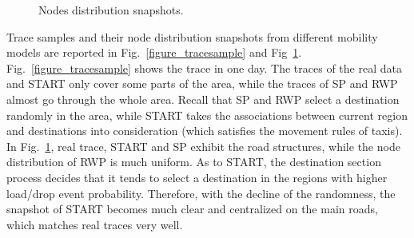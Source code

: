 \begin{figure}[!t]
\centering
{}
\caption{Nodes distribution snapshots.}\label{figure_trace_snapshots}
\end{figure}

Trace samples and their node distribution snapshots from different mobility models are reported in Fig.~\ref{figure_tracesample} and Fig~\ref{figure_trace_snapshots}. Fig.~\ref{figure_tracesample} shows the trace in one day. The traces of the real data and START only cover some parts of the area, while the traces of SP and RWP almost go through the whole area. Recall that SP and RWP select a destination randomly in the area, while START takes the associations between current region and destinations into consideration (which satisfies the movement rules of taxis). In Fig.~\ref{figure_trace_snapshots}, real trace, START and SP exhibit the road structures, while the node distribution of RWP is much uniform. As to START, the destination section process decides that it tends to select a destination in the regions with higher load/drop event probability. Therefore, with the decline of the randomness, the snapshot of START becomes much clear and centralized on the main roads, which matches real traces very well.

